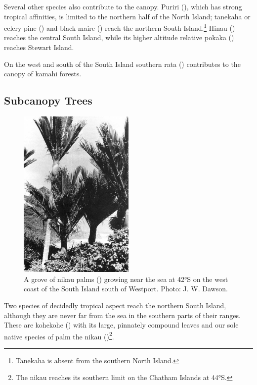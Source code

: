 Several other species also contribute to the canopy.
Puriri (), which has strong tropical affinities, is limited to the northern half of the North Island; tanekaha or celery pine () and black maire () reach the northern South Island.\footnote{Tanekaha is absent from the southern North Island.}
Hinau () reaches the central South Island, while its higher altitude relative pokaka () reaches Stewart Island.

On the west and south of the South Island southern rata () contributes to the canopy of kamahi forests.

\subsection{Subcanopy Trees}

\begin{figure}
	\includegraphics[width=0.5\textwidth]{graphics/figure60nikau.jpg}
	\centering
	\caption[A grove of nikau palms]{A grove of nikau palms () growing near the sea at 42°S on the west coast of the South Island south of Westport. Photo:  J. W. Dawson.}
	\label{fig:60nikau}
\end{figure}

Two species of decidedly tropical aspect reach the northern South Island, although they are never far from the sea in the southern parts of their ranges.
These are kohekohe () with its large, pinnately compound leaves and our sole native species of palm the nikau ()\footnote{The nikau reaches its southern limit on the Chatham Islands at 44°S.}.

